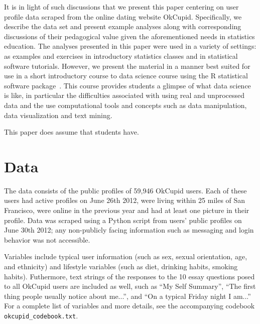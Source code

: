 \documentclass{article}\usepackage[]{graphicx}\usepackage[]{color}
\begin{document}
It is in light of such discussions that we present this paper centering on user profile data scraped from the online dating website OkCupid.  Specifically, we describe the data set and present example analyses along with corresponding discussions of their pedagogical value given the aforementioned needs in statistics education.  The analyses presented in this paper were used in a variety of settings: as examples and exercises in introductory statistics classes and in statistical software tutorials.  However, we present the material in a manner best suited for use in a short introductory course to data science course using the R statistical software package~\cite{R}. This course provides students a glimpse of what data science is like, in particular the difficulties associated with using real and unprocessed data and the use computational tools and concepts such as data manipulation, data visualization and text mining.

This paper does assume that students have.










%
\section{Data}
%
The data consists of the public profiles of 59,946 OkCupid users. Each of these users had active profiles on June 26th 2012, were living within 25 miles of San Francisco, were online in the previous year and had at least one picture in their profile. Data was scraped using a Python script from users' public profiles on June 30th 2012; any non-publicly facing information such as messaging and login behavior was not accessible.

Variables include typical user information (such as sex, sexual orientation, age, and ethnicity) and lifestyle variables (such as diet, drinking habits, smoking habits).  Futhermore, text strings of the responses to the 10 essay questions posed to all OkCupid users are included as well, such as ``My Self Summary'', ``The first thing people usually notice about me...'', and ``On a typical Friday night I am...''  For a complete list of variables and more details, see the accompanying codebook \verb#okcupid_codebook.txt#.
\end{document}
